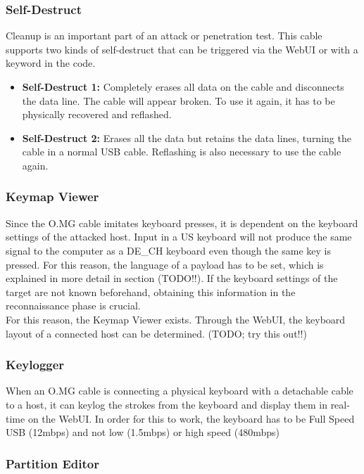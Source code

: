\subsubsection{Self-Destruct}

Cleanup is an important part of an attack or penetration test. This cable supports two kinds of self-destruct that can be triggered via the WebUI or with a keyword in the code.
\begin{itemize}
    \item  \textbf{Self-Destruct 1:} Completely erases all data on the cable and disconnects the data line. The cable will appear broken. To use it again, it has to be physically recovered and reflashed.  
    \item  \textbf{Self-Destruct 2:}  Erases all the data but retains the data lines, turning the cable in a normal USB cable. Reflashing is also necessary to use the cable again. 
\end{itemize}


\subsubsection{Keymap Viewer}

Since the O.MG cable imitates keyboard presses, it is dependent on the keyboard settings of the attacked host. Input in a US keyboard will not produce the same signal to the computer as a DE\_CH keyboard even though the same key is pressed. For this reason, the language of a payload has to be set, which is explained in more detail in section (TODO!!). If the keyboard settings of the target are not known beforehand, obtaining this information in the reconnaissance phase is crucial. \\
For this reason, the Keymap Viewer exists. Through the WebUI, the keyboard layout of a connected host can be determined. (TODO; try this out!!)

\subsubsection{Keylogger}

When an O.MG cable is connecting a physical keyboard with a detachable cable to a host, it can keylog the strokes from the keyboard and display them in real-time on the WebUI. In order for this to work, the keyboard has to be Full Speed USB (12mbps) and not low (1.5mbps) or high speed (480mbps) 

\subsubsection{Partition Editor}


